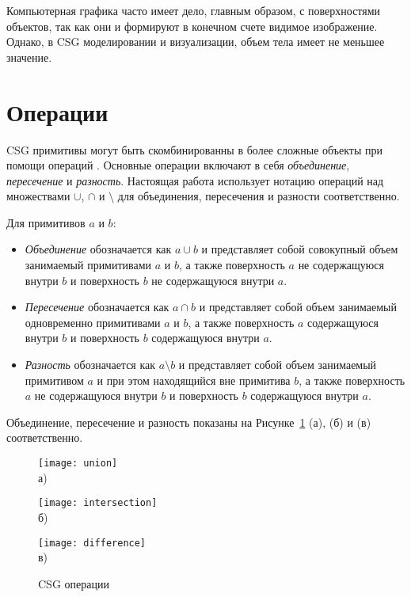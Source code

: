 Компьютерная графика часто имеет дело, главным образом, с поверхностями объектов, так как они и формируют в конечном счете видимое изображение. Однако, в CSG моделировании и визуализации, объем тела имеет не меньшее значение.

\section{Операции} \label{sect_operations}


CSG примитивы могут быть скомбинированны в более сложные объекты при помощи операций . Основные операции включают в себя \textit{объединение}, \textit{пересечение} и \textit{разность}. Настоящая работа использует нотацию операций над множествами $\cup$, $\cap$ и $\setminus$ для объединения, пересечения и разности соответственно.

\noindent Для примитивов $a$ и $b$:
\begin{itemize}
  \item \textit{Объединение} обозначается как $a \cup b$ и представляет собой совокупный объем занимаемый примитивами $a$ и $b$, а также поверхность $a$ не содержащуюся внутри $b$ и поверхность $b$ не содержащуюся внутри $a$.

  \item \textit{Пересечение} обозначается как $a \cap b$ и представляет собой объем занимаемый одновременно примитивами $a$ и $b$, а также поверхность $a$ содержащуюся внутри $b$ и поверхность $b$ содержащуюся внутри $a$.

  \item \textit{Разность} обозначается как $a \setminus b$ и представляет собой объем занимаемый примитивом $a$ и при этом находящийся вне примитива $b$, а также поверхность $a$ не содержащуюся внутри $b$ и поверхность $b$ содержащуюся внутри $a$.
\end{itemize}

Объединение, пересечение и разность показаны на Рисунке~\ref{fig:operations} (а), (б) и (в) соответственно.

\begin{figure}[ht]
  \begin{minipage}[ht]{0.3\linewidth}\centering
    \texttt{[image: union]} \\ а)
  \end{minipage}
  \hfill
  \begin{minipage}[ht]{0.3\linewidth}\centering
    \texttt{[image: intersection]} \\ б)
  \end{minipage}
  \hfill
  \begin{minipage}[ht]{0.3\linewidth}\centering
    \texttt{[image: difference]} \\ в)
  \end{minipage}
  \caption{CSG операции}
  \label{fig:operations}  
\end{figure}


